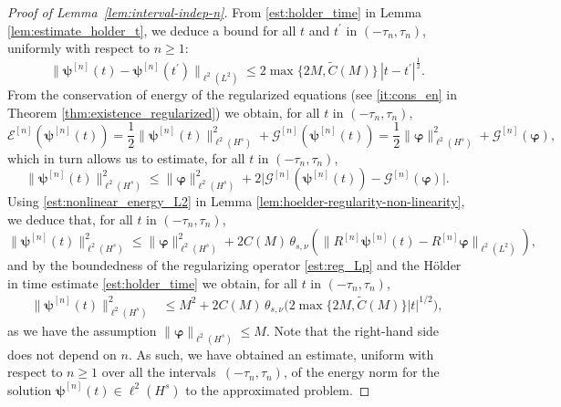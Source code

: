 \documentclass[12pt,a4paper]{amsart}
\numberwithin{equation}{section}
\newcommand{\ulpsi}{\boldsymbol{\psi}}
\newcommand{\ulphi}{\boldsymbol{\varphi}}
\newcommand{\thetasnu}{\theta_{s,\nu}}
\begin{document}
\begin{proof}[Proof of Lemma~\ref{lem:interval-indep-n}]
		From \eqref{est:holder_time} in Lemma \ref{lem:estimate_holder_t}, we deduce a bound for all $t$ and $t^\prime$ in $(-\tau_n, \tau_n)$, uniformly with respect to $ n \geq 1$: 
		\begin{equation}\label{est:L2_holder_continuity}
			\| \ulpsi^{[n]}(t)-\ulpsi^{[n]}(t^\prime) \|_{\ell^2(L^2)} \leq 2 \max\{2M, \tilde{C}(M)\}\, | t-t^\prime |^{\frac12} .
		\end{equation}
		From the conservation of energy of the regularized equations (see \ref{it:cons_en} in Theorem \ref{thm:existence_regularized}) we obtain, for all $t$ in $(-\tau_n, \tau_n) $,
		\begin{equation*}
			\mathcal{E}^{[n]}(\ulpsi^{[n]}(t)) = \frac{1}{2} \| \ulpsi^{[n]}(t) \|_{\ell^2(H^{s})}^2 +  \mathscr{G}^{[n]}(\ulpsi^{[n]}(t)) = \frac{1}{2} \| \ulphi  \|_{\ell^2(H^{s})}^2 + \mathscr{G}^{[n]}(\ulphi ),
		\end{equation*}
		which in turn allows us to estimate, for all $t$ in $(-\tau_n, \tau_n) $,
		\begin{equation*}
			\| \ulpsi^{[n]}(t) \|_{\ell^2(H^{s})}^2 \leq \| \ulphi  \|_{\ell^2(H^{s})}^2 +2  \big| \mathscr{G}^{[n]}(\ulpsi^{[n]}(t)) - \mathscr{G}^{[n]}(\ulphi ) \big| .
		\end{equation*}
		Using \eqref{est:nonlinear_energy_L2} in Lemma \ref{lem:hoelder-regularity-non-linearity}, we deduce that, for all $t$ in $(-\tau_n, \tau_n) $,
		\begin{equation*}
			\| \ulpsi^{[n]}(t) \|_{\ell^2(H^{s})}^2 \leq \| \ulphi \|_{\ell^2(H^{s})}^2 +2  C(M) \, \thetasnu (\| R^{[n]}\ulpsi^{[n]}(t)-R^{[n]}\ulphi \|_{\ell^2(L^2)})  ,
		\end{equation*}
		and by the boundedness of the regularizing operator \eqref{est:reg_Lp} and the H{\"o}lder in time estimate \eqref{est:holder_time} we obtain, for all $t$ in $(-\tau_n, \tau_n) $,
		\begin{align*}
			\| \ulpsi^{[n]}(t) \|_{\ell^2(H^{s})}^2 
			&\leq M^2 + 2  C(M) \, \thetasnu \big( 2 \max\{2M,\tilde{C}(M)\}  |t|^{1/2} \big) ,
		\end{align*}
		as we have the assumption $ \| \ulphi \|_{\ell^2(H^{s})} \leq M $.  Note that the right-hand side does not depend on $n$. As such, we have obtained an estimate,  uniform with respect to $ n \geq 1$ over all the intervals~$ (-\tau_n, \tau_n) $, of the energy norm for the solution $\ulpsi^{[n]}(t) \in \ell^2(H^{s}) $ to the approximated problem.
		

\end{proof}
\end{document}
